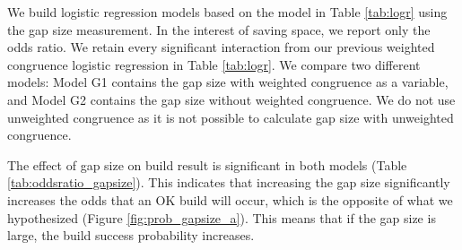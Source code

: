 \documentclass[12pt,oneside]{book}
\begin{document}

We build logistic regression models based on the model in Table \ref{tab:logr} using the gap size measurement. In the interest of saving space, we report only the odds ratio. We retain every significant interaction from our previous weighted congruence logistic regression in Table \ref{tab:logr}.
We compare two different models: Model G1 contains the gap size with weighted congruence as a variable, and Model G2 contains the gap size without weighted congruence.  We do not use unweighted congruence as it is not possible to calculate gap size with unweighted congruence.

The effect of gap size on build result is significant in both models (Table \ref{tab:oddsratio_gapsize}). This indicates that increasing the gap size significantly increases the odds that an OK build will occur, which is the opposite of what we hypothesized (Figure \ref{fig:prob_gapsize_a}). This means that if the gap size is large, the build success probability increases.

\end{document}
